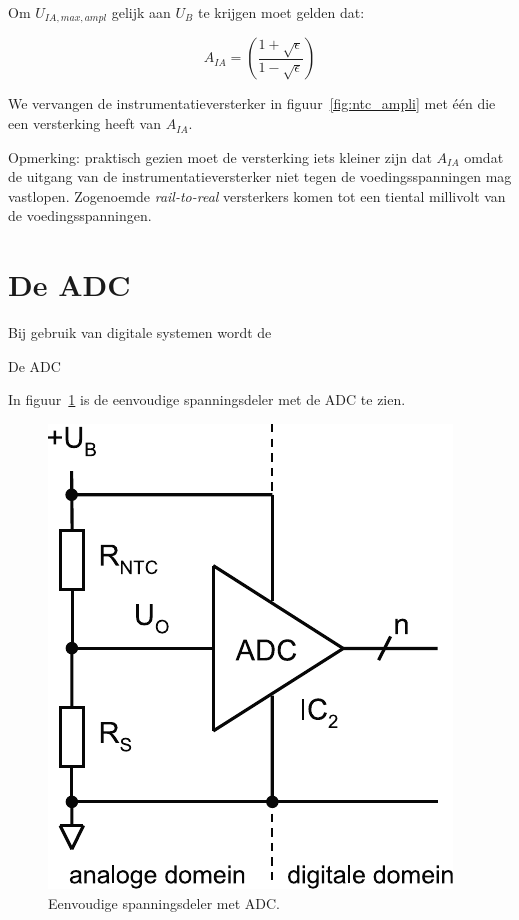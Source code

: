 \documentclass[12pt,a4paper,final,twoside,fleqn]{article}
\let\oldcdot\cdot
\renewcommand{\cdot}{\kern-.10em\oldcdot\kern-.10em}
\begin{document}
Om $U_{IA,max,ampl}$ gelijk aan $U_B$ te krijgen moet gelden dat:


\begin{equation}
A_{IA} = \left(\dfrac{1+\sqrt{\epsilon}}{1-\sqrt{\epsilon}}\right)%
\end{equation}

We vervangen de instrumentatieversterker in figuur~\ref{fig:ntc_ampli} met
\'e\'en die een versterking heeft van $A_{IA}$.

Opmerking: praktisch gezien moet de versterking iets kleiner zijn dat $A_{IA}$
omdat de uitgang van de instrumentatieversterker niet tegen de voedingsspanningen
mag vastlopen. Zogenoemde \textsl{rail-to-real} versterkers komen tot een tiental
millivolt van de voedingsspanningen.



\clearpage
\section{De ADC}
Bij gebruik van digitale systemen wordt de 

De ADC 

In figuur~\ref{fig:ntc_voltagediv_adc} is de eenvoudige spanningsdeler met de ADC
te zien.

\begin{figure}[ht!]
\centering
\includegraphics[scale=0.63]{drawings/ntc_voltagediv_adc}
\caption[Eenvoudige spanningsdeler met ADC]{Eenvoudige spanningsdeler met ADC.}
\label{fig:ntc_voltagediv_adc}
\end{figure}
\end{document}
